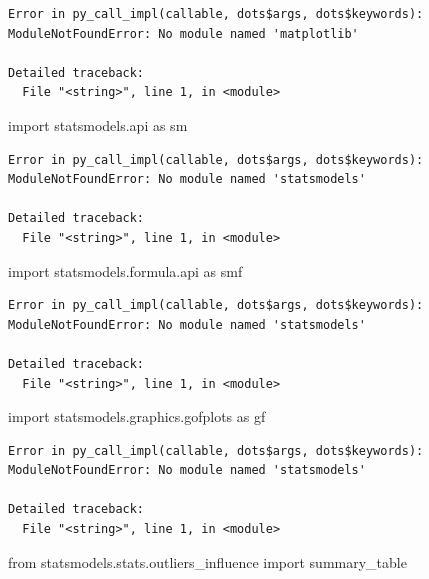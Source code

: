 \documentclass[]{book}
\newenvironment{Shaded}{\begin{snugshade}}{\end{snugshade}}
\newcommand{\ImportTok}[1]{#1}
\newcommand{\NormalTok}[1]{#1}
\begin{document}
\begin{verbatim}
Error in py_call_impl(callable, dots$args, dots$keywords): ModuleNotFoundError: No module named 'matplotlib'

Detailed traceback: 
  File "<string>", line 1, in <module>
\end{verbatim}

\begin{Shaded}
\begin{Highlighting}[]
\ImportTok{import}\NormalTok{ statsmodels.api }\ImportTok{as}\NormalTok{ sm}
\end{Highlighting}
\end{Shaded}

\begin{verbatim}
Error in py_call_impl(callable, dots$args, dots$keywords): ModuleNotFoundError: No module named 'statsmodels'

Detailed traceback: 
  File "<string>", line 1, in <module>
\end{verbatim}

\begin{Shaded}
\begin{Highlighting}[]
\ImportTok{import}\NormalTok{ statsmodels.formula.api }\ImportTok{as}\NormalTok{ smf}
\end{Highlighting}
\end{Shaded}

\begin{verbatim}
Error in py_call_impl(callable, dots$args, dots$keywords): ModuleNotFoundError: No module named 'statsmodels'

Detailed traceback: 
  File "<string>", line 1, in <module>
\end{verbatim}

\begin{Shaded}
\begin{Highlighting}[]
\ImportTok{import}\NormalTok{ statsmodels.graphics.gofplots }\ImportTok{as}\NormalTok{ gf}
\end{Highlighting}
\end{Shaded}

\begin{verbatim}
Error in py_call_impl(callable, dots$args, dots$keywords): ModuleNotFoundError: No module named 'statsmodels'

Detailed traceback: 
  File "<string>", line 1, in <module>
\end{verbatim}

\begin{Shaded}
\begin{Highlighting}[]
\ImportTok{from}\NormalTok{ statsmodels.stats.outliers_influence }\ImportTok{import}\NormalTok{ summary_table}
\end{Highlighting}
\end{Shaded}
\end{document}
